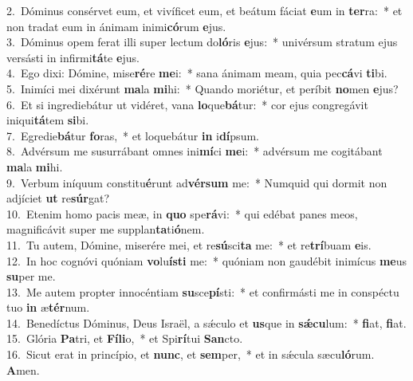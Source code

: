 {2.~}Dóminus consérvet eum, et vivíficet eum, et beátum fáciat \textbf{e}um in \textbf{ter}ra:~* et non tradat eum in ánimam inimi\textbf{có}rum \textbf{e}jus.\\
{3.~}Dóminus opem ferat illi super lectum do\textbf{ló}ris \textbf{e}jus:~* univérsum stratum ejus versásti in infirmi\textbf{tá}te \textbf{e}jus.\\
{4.~}Ego dixi: Dómine, mise\textbf{ré}re \textbf{me}i:~* sana ánimam meam, quia pec\textbf{cá}vi \textbf{ti}bi.\\
{5.~}Inimíci mei dixérunt \textbf{ma}la \textbf{mi}hi:~* Quando moriétur, et períbit \textbf{no}men \textbf{e}jus?\\
{6.~}Et si ingrediebátur ut vidéret, vana \textbf{lo}que\textbf{bá}tur:~* cor ejus congregávit iniqui\textbf{tá}tem \textbf{si}bi.\\
{7.~}Egredie\textbf{bá}tur \textbf{fo}ras,~* et loquebátur \textbf{in} i\textbf{dí}psum.\\
{8.~}Advérsum me susurrábant omnes ini\textbf{mí}ci \textbf{me}i:~* advérsum me cogitábant \textbf{ma}la \textbf{mi}hi.\\
{9.~}Verbum iníquum constitu\textbf{é}runt ad\textbf{vér}\textbf{sum} me:~* Numquid qui dormit non adjíciet \textbf{ut} re\textbf{súr}gat?\\
{10.~}Etenim homo pacis meæ, in \textbf{quo} spe\textbf{rá}vi:~* qui edébat panes meos, magnificávit super me supplan\textbf{ta}ti\textbf{ó}nem.\\
{11.~}Tu autem, Dómine, miserére mei, et re\textbf{sú}sci\textbf{ta} me:~* et re\textbf{trí}buam \textbf{e}is.\\
{12.~}In hoc cognóvi quóniam \textbf{vo}lu\textbf{í}\textbf{sti} me:~* quóniam non gaudébit inimícus \textbf{me}us \textbf{su}per me.\\
{13.~}Me autem propter innocéntiam \textbf{su}sce\textbf{pí}sti:~* et confirmásti me in conspéctu tuo \textbf{in} æ\textbf{tér}num.\\
{14.~}Benedíctus Dóminus, Deus Israël, a sǽculo et \textbf{us}que in \textbf{sǽ}\textbf{cu}lum:~* \textbf{fi}at, \textbf{fi}at.\\
{15.~}Glória \textbf{Pa}tri, et \textbf{Fí}\textbf{li}o,~* et Spi\textbf{rí}tui \textbf{San}cto.\\
{16.~}Sicut erat in princípio, et \textbf{nunc}, et \textbf{sem}per,~* et in sǽcula sæcu\textbf{ló}rum. \textbf{A}men.\\
